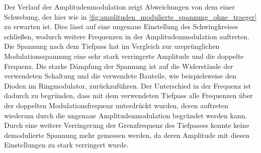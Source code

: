 


Der Verlauf der Amplitudenmodulation zeigt Abweichungen von dem einer Schwebung, der hier 
wie in \cref{fig:amplituden_modulierte_spannung_ohne_traeger} zu erwarten ist. Dies lässt auf eine ungenaue 
Einstellung des Schwingkreises schließen, wodurch weitere Frequenzen in der Amplitudenmodulation auftreten.
Die Spannung nach dem Tiefpass hat im Vergleich zur ursprünglichen Modulationsspannung eine sehr stark verringerte
Amplitude und die doppelte Frequenz. Die starke Dämpfung der Spannung ist auf die Widerstände der verwendeten 
Schaltung und die verwendete Bauteile, wie beispielsweise den Dioden im Ringmodulator, zurückzuführen. Der 
Unterschied in der Frequenz ist dadurch zu begründen, dass mit dem verwendeten 
Tiefpass alle Frequenzen über der doppelten Modulationsfrequenz unterdrückt wurden, deren auftreten wiederum durch 
die ungenaue Amplitudenmodulation begründet werden kann. Durch eine weitere Verringerung der Grenzfrequenz des
Tiefpasses konnte keine demodulierte Spannung mehr gemessen werden, da deren Amplitude mit diesen Einstellungen 
zu stark verringert wurde.